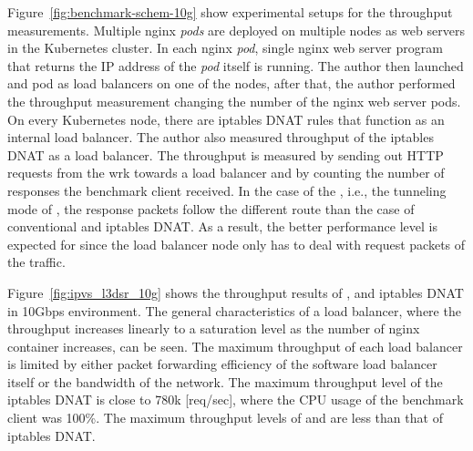 Figure~\ref{fig:benchmark-schem-10g} show experimental setups for the throughput measurements.
Multiple nginx {\em pods} are deployed on multiple nodes as web servers in the Kubernetes cluster.
In each nginx {\em pod}, single nginx web server program that returns the IP address of the {\em pod} itself is running.
The author then launched  and  pod as load balancers on one of the nodes, after that, the author performed the throughput measurement changing the number of the nginx web server pods.
On every Kubernetes node, there are iptables DNAT rules that function as an internal load balancer.
The author also measured throughput of the iptables DNAT as a load balancer.
The throughput is measured by sending out HTTP requests from the wrk towards a load balancer and by counting the number of responses the benchmark client received.
In the case of the , i.e., the tunneling mode of , the response packets follow the different route than the case of conventional  and iptables DNAT.
As a result, the better performance level is expected for  since the load balancer node only has to deal with request packets of the traffic.

\FloatBarrier

Figure~\ref{fig:ipvs_l3dsr_10g} shows the throughput results of ,  and iptables DNAT in 10Gbps environment.
The general characteristics of a load balancer, where the throughput increases linearly to a saturation level as the number of nginx container increases, can be seen.
The maximum throughput of each load balancer is limited by either packet forwarding efficiency of the software load balancer itself or the bandwidth of the network.
The maximum throughput level of the iptables DNAT is close to 780k [req/sec], where the CPU usage of the benchmark client was 100\%.
The maximum throughput levels of  and  are less than that of iptables DNAT. 


